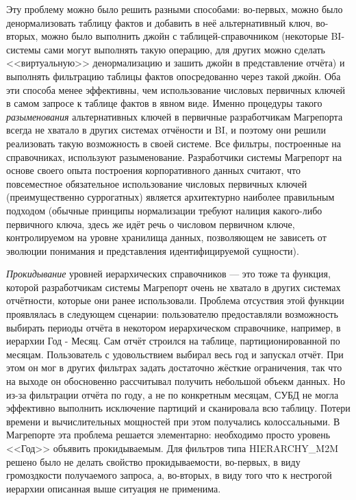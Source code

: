 \documentclass[../user-manual.tex]{subfiles}
\begin{document}
	\begin{boxed}
		Эту проблему можно было решить разными способами: во-первых, можно было денормализовать таблицу фактов и добавить в неё альтернативный ключ, во-вторых, можно было выполнить джойн с таблицей-справочником (некоторые BI-системы сами могут выполнять такую операцию, для других можно сделать <<виртуальную>> денормализацию и зашить джойн в представление отчёта) и выполнять фильтрацию таблицы фактов опосредованно через такой джойн. Оба эти способа менее эффективны, чем использование числовых первичных ключей в самом запросе к таблице фактов в явном виде. Именно процедуры такого \textit{разыменования} альтернативных ключей в первичные разработчикам Магрепорта всегда не хватало в других системах отчёности и BI, и поэтому они решили реализовать такую возможность в своей системе. Все фильтры, построенные на справочниках, используют разыменование. Разработчики системы Магрепорт на основе своего опыта построения корпоративного данных считают, что повсеместное обязательное использование числовых первичных ключей (преимущественно суррогатных) является архитектурно наиболее правильным подходом (обычные принципы нормализации требуют налиция какого-либо первичного ключа, здесь же идёт речь о числовом первичном ключе, контролируемом на уровне хранилища данных, позволяющем не зависеть от эволюции понимания и представления идентифицируемой сущности).
	\end{boxed}

	\begin{concept}
		\textit{Прокидывание} уровней иерархических справочников --- это тоже та функция, которой разработчикам системы Магрепорт очень не хватало в других системах отчётности, которые они ранее использовали. Проблема отсуствия этой функции проявлялась в следующем сценарии: пользователю предоставляли возможность выбирать периоды отчёта в некотором иерархическом справочнике, например, в иерархии Год - Месяц. Сам отчёт строился на таблице, партиционированной по месяцам. Пользователь с удовольствием выбирал весь год и запускал отчёт. При этом он мог в других фильтрах задать достаточно жёсткие ограничения, так что на выходе он обосновенно рассчитывал получить небольшой объекм данных. Но из-за фильтрации отчёта по году, а не по конкретным месяцам, СУБД не могла эффективно выполнить исключение партиций и сканировала всю таблицу. Потери времени и вычислительных мощностей при этом получались колоссальными. В Магрепорте эта проблема решается элементарно: необходимо просто уровень <<Год>> объявить прокидываемым. Для фильтров типа HIERARCHY\_M2M решено было не делать свойство прокидываемости, во-первых, в виду громоздкости получаемого запроса, а, во-вторых, в виду того что к нестрогой иерархии описанная выше ситуация не применима.
	\end{concept}
\end{document}
